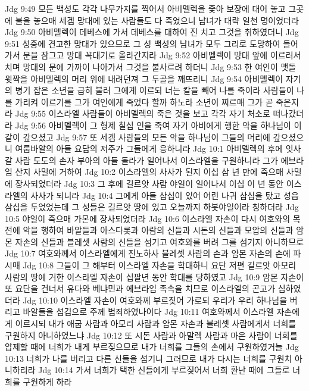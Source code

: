Jdg 9:49  모든 백성도 각각 나무가지를 찍어서 아비멜렉을 좇아 보장에 대어 놓고 그곳에 불을 놓으매 세겜 망대에 있는 사람들도 다 죽었으니 남녀가 대략 일천 명이었더라
Jdg 9:50  아비멜렉이 데베스에 가서 데베스를 대하여 진 치고 그것을 취하였더니
Jdg 9:51  성중에 견고한 망대가 있으므로 그 성 백성의 남녀가 모두 그리로 도망하여 들어가서 문을 잠그고 망대 꼭대기로 올라간지라
Jdg 9:52  아비멜렉이 망대 앞에 이르러서 치며 망대의 문에 가까이 나아가서 그것을 불사르려 하더니
Jdg 9:53  한 여인이 맷돌 윗짝을 아비멜렉의 머리 위에 내려던져 그 두골을 깨뜨리니
Jdg 9:54  아비멜렉이 자기의 병기 잡은 소년을 급히 불러 그에게 이르되 너는 칼을 빼어 나를 죽이라 사람들이 나를 가리켜 이르기를 그가 여인에게 죽었다 할까 하노라 소년이 찌르매 그가 곧 죽은지라
Jdg 9:55  이스라엘 사람들이 아비멜렉의 죽은 것을 보고 각각 자기 처소로 떠나갔더라
Jdg 9:56  아비멜렉이 그 형제 칠십 인을 죽여 자기 아비에게 행한 악을 하나님이 이같이 갚으셨고
Jdg 9:57  또 세겜 사람들의 모든 악을 하나님이 그들의 머리에 갚으셨으니 여룹바알의 아들 요담의 저주가 그들에게 응하니라
Jdg 10:1  아비멜렉의 후에 잇사갈 사람 도도의 손자 부아의 아들 돌라가 일어나서 이스라엘을 구원하니라 그가 에브라임 산지 사밀에 거하여
Jdg 10:2  이스라엘의 사사가 된지 이십 삼 년 만에 죽으매 사밀에 장사되었더라
Jdg 10:3  그 후에 길르앗 사람 야일이 일어나서 이십 이 년 동안 이스라엘의 사사가 되니라
Jdg 10:4  그에게 아들 삼십이 있어 어린 나귀 삼십을 탔고 성읍 삼십을 두었었는데 그 성들은 길르앗 땅에 있고 오늘까지 하봇야일이라 칭하더라
Jdg 10:5  야일이 죽으매 가몬에 장사되었더라
Jdg 10:6  이스라엘 자손이 다시 여호와의 목전에 악을 행하여 바알들과 아스다롯과 아람의 신들과 시돈의 신들과 모압의 신들과 암몬 자손의 신들과 블레셋 사람의 신들을 섬기고 여호와를 버려 그를 섬기지 아니하므로
Jdg 10:7  여호와께서 이스라엘에게 진노하사 블레셋 사람의 손과 암몬 자손의 손에 파시매
Jdg 10:8  그들이 그 해부터 이스라엘 자손을 학대하니 요단 저편 길르앗 아모리 사람의 땅에 거한 이스라엘 자손이 십팔년 동안 학대를 당하였고
Jdg 10:9  암몬 자손이 또 요단을 건너서 유다와 베냐민과 에브라임 족속을 치므로 이스라엘의 곤고가 심하였더라
Jdg 10:10  이스라엘 자손이 여호와께 부르짖어 가로되 우리가 우리 하나님을 버리고 바알들을 섬김으로 주께 범죄하였나이다
Jdg 10:11  여호와께서 이스라엘 자손에게 이르시되 내가 애굽 사람과 아모리 사람과 암몬 자손과 블레셋 사람에게서 너희를 구원하지 아니하였느냐
Jdg 10:12  또 시돈 사람과 아말렉 사람과 마온 사람이 너희를 압제할 때에 너희가 내게 부르짖으므로 내가 너희를 그들의 손에서 구원하였거늘
Jdg 10:13  너희가 나를 버리고 다른 신들을 섬기니 그러므로 내가 다시는 너희를 구원치 아니하리라
Jdg 10:14  가서 너희가 택한 신들에게 부르짖어서 너희 환난 때에 그들로 너희를 구원하게 하라
